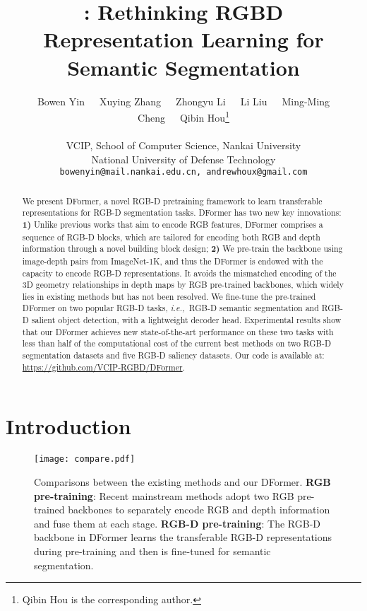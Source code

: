 \documentclass{article}
\title{\nMethod{}: Rethinking RGBD Representation Learning for Semantic Segmentation}
\author{Bowen Yin~~~Xuying Zhang~~~Zhongyu Li~~~Li Liu~~~Ming-Ming Cheng~~~Qibin Hou\thanks{Qibin Hou is the corresponding author.} \\ \\
 VCIP, School of Computer Science, Nankai University \\
 National University of Defense Technology\\
{\tt\small bowenyin@mail.nankai.edu.cn, andrewhoux@gmail.com}
}
\def\ie{\emph{i.e.,~}}
\newcommand{\nMethod}{DFormer}
\begin{document}
\maketitle

\vspace{-10pt}
\begin{abstract}


We present \nMethod{}, a novel RGB-D pretraining framework to learn transferable representations for RGB-D segmentation tasks.
\nMethod{} has two new key innovations:
\textbf{1)} Unlike previous works that aim to encode RGB features, \nMethod{} comprises a sequence of RGB-D blocks, which are tailored for encoding both RGB and depth information through a novel building block design;
\textbf{2)} We pre-train the backbone using image-depth pairs from ImageNet-1K, and thus the \nMethod{} is endowed with the capacity to encode RGB-D representations. 
It avoids the mismatched encoding of the 3D geometry relationships in depth maps by RGB pre-trained backbones, which widely lies in existing methods but has not been resolved.
We fine-tune the pre-trained \nMethod{} on two popular RGB-D tasks, \ie RGB-D semantic segmentation and RGB-D salient object detection, with a lightweight decoder head.
Experimental results show that our \nMethod{} achieves new state-of-the-art performance on these two tasks with less than half of the computational cost of the current best methods on two RGB-D segmentation datasets and five RGB-D saliency datasets.
Our code is available at: \href{https://github.com/VCIP-RGBD/DFormer}{https://github.com/VCIP-RGBD/DFormer}.
\end{abstract}




\section{Introduction} \label{sec:intro}

\begin{figure}[!ht]
\centering
\vspace{-0.2cm}
\texttt{[image: compare.pdf]}
\caption{\small Comparisons between the existing methods and our \nMethod{}.
\textbf{RGB pre-training}: Recent mainstream methods adopt two RGB pre-trained backbones to separately encode RGB and depth information and fuse them at each stage.
\textbf{RGB-D pre-training}: The RGB-D backbone in \nMethod{} learns the transferable RGB-D representations during pre-training and then is fine-tuned for semantic segmentation.
}\label{fig:compare}
\end{figure}
\end{document}
